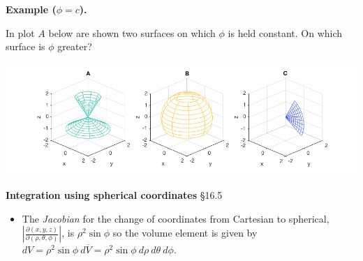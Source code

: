 \documentclass[12pt,letterpaper,noanswers]{exam}
\begin{document}
\noindent\textbf{Example ($\phi = c$).}

In plot $A$ below are shown two surfaces on which $\phi$ is held constant.  On which surface is $\phi$ greater? 

\includegraphics[width=0.7\linewidth]{img/C20p7.png}
    
    

    \noindent\textbf{Integration using spherical coordinates} \S 16.5
    \begin{tcolorbox}
    \begin{itemize}
\item The \emph{Jacobian} for the change of coordinates from Cartesian to spherical, $\displaystyle\left\vert\frac{\partial(x,y,z)}{\partial(\rho,\theta,\phi)}\right\vert$, is $\rho^2\sin\phi$ so the volume element is given by $dV = \rho^2\sin\phi\ d\overline{V} = \rho^2\sin\phi\ d\rho\ d\theta\ d\phi$.

\end{itemize} 




\end{tcolorbox}







\end{document}

